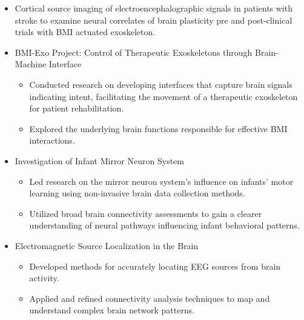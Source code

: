 \documentclass[10pt,letterpaper,sans]{moderncv}   %
\begin{document}
{{
	\begin{itemize}                         
		\item Cortical source imaging of electroencephalographic signals in patients with stroke to examine neural correlates of brain plasticity pre and post-clinical trials with BMI actuated exoskeleton.
	\end{itemize}
}}


{{
	\begin{itemize} 
		\item BMI-Exo Project: Control of Therapeutic Exoskeletons through Brain-Machine Interface
				\begin{itemize}
					\item Conducted research on developing interfaces that capture brain signals indicating intent, facilitating the movement of a therapeutic exoskeleton for patient rehabilitation.
					\item Explored the underlying brain functions responsible for effective BMI interactions.
				\end{itemize}
				\vspace{3pt}
		\item Investigation of Infant Mirror Neuron System
				\begin{itemize}
					\item Led research on the mirror neuron system's influence on infants' motor learning using non-invasive brain data collection methods.
					\item Utilized broad brain connectivity assessments to gain a clearer understanding of neural pathways influencing infant behavioral patterns.
				\end{itemize}
		\item Electromagnetic Source Localization in the Brain
				\begin{itemize}
					\item Developed methods for accurately locating EEG sources from brain activity.
					\item Applied and refined connectivity analysis techniques to map and understand complex brain network patterns.
				\end{itemize}
	\end{itemize}
}}
\vspace{10pt}
\end{document}
